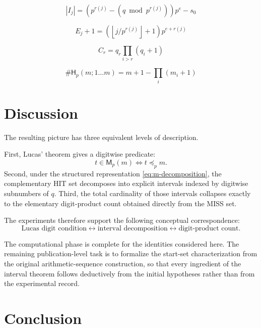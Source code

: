 \documentclass[11pt,a4paper]{article}
\theoremstyle{definition}
\theoremstyle{remark}
\newcommand{\hit}{\mathsf{H}}
\newcommand{\miss}{\mathsf{M}}
\newcommand{\floor}[1]{\left\lfloor #1\right\rfloor}
\begin{document}
\begin{equation}
\boxed{
 |I_j|=
 \left(p^{r(j)}-(q\bmod p^{r(j)})\right)p^e-s_0
}
\end{equation}

\begin{equation}
\boxed{
 E_j+1
 =
 \left(\floor{j/p^{r(j)}}+1\right)p^{e+r(j)}
}
\end{equation}

\begin{equation}
\boxed{
 C_r=q_r\prod_{i>r}(q_i+1)
}
\end{equation}

\begin{equation}
\boxed{
 \#\hit_p(m;1\ldots m)
 =
 m+1-\prod_i(m_i+1)
}
\end{equation}

\section{Discussion}

The resulting picture has three equivalent levels of description.

First, Lucas' theorem gives a digitwise predicate:
\begin{equation}
 t\in\miss_p(m)\iff t\preceq_p m.
\end{equation}
Second, under the structured representation \eqref{eq:m-decomposition}, the complementary HIT set decomposes into explicit intervals indexed by digitwise subnumbers of $q$. Third, the total cardinality of those intervals collapses exactly to the elementary digit-product count obtained directly from the MISS set.

The experiments therefore support the following conceptual correspondence:
\begin{equation}
\text{Lucas digit condition}
\longleftrightarrow
\text{interval decomposition}
\longleftrightarrow
\text{digit-product count}.
\end{equation}

The computational phase is complete for the identities considered here. The remaining publication-level task is to formalize the start-set characterization from the original arithmetic-sequence construction, so that every ingredient of the interval theorem follows deductively from the initial hypotheses rather than from the experimental record.

\section{Conclusion}
\end{document}
